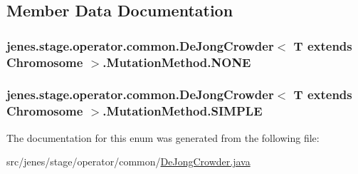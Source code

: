 \subsection{Member Data Documentation}
\hypertarget{enumjenes_1_1stage_1_1operator_1_1common_1_1_de_jong_crowder_3_01_t_01extends_01_chromosome_01_4_1_1_mutation_method_a4246323cddc2e810f35513c3b3c033b3}{
\subsubsection[{N\-O\-N\-E}]{\setlength{\rightskip}{0pt plus 5cm}jenes.\-stage.\-operator.\-common.\-De\-Jong\-Crowder$<$ T extends Chromosome $>$.Mutation\-Method.\-N\-O\-N\-E}}\label{enumjenes_1_1stage_1_1operator_1_1common_1_1_de_jong_crowder_3_01_t_01extends_01_chromosome_01_4_1_1_mutation_method_a4246323cddc2e810f35513c3b3c033b3}
\hypertarget{enumjenes_1_1stage_1_1operator_1_1common_1_1_de_jong_crowder_3_01_t_01extends_01_chromosome_01_4_1_1_mutation_method_a152a3269512eba449ae0fa420bc5d060}{
\subsubsection[{S\-I\-M\-P\-L\-E}]{\setlength{\rightskip}{0pt plus 5cm}jenes.\-stage.\-operator.\-common.\-De\-Jong\-Crowder$<$ T extends Chromosome $>$.Mutation\-Method.\-S\-I\-M\-P\-L\-E}}\label{enumjenes_1_1stage_1_1operator_1_1common_1_1_de_jong_crowder_3_01_t_01extends_01_chromosome_01_4_1_1_mutation_method_a152a3269512eba449ae0fa420bc5d060}


The documentation for this enum was generated from the following file\-:\begin{DoxyCompactItemize}
\item 
src/jenes/stage/operator/common/\hyperlink{_de_jong_crowder_8java}{De\-Jong\-Crowder.\-java}\end{DoxyCompactItemize}
